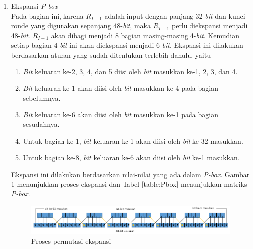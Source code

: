 \begin{enumerate}
	\item Ekspansi \textit{P-box}\\
	Pada bagian ini, karena \begin{math}R_{I-1}\end{math} adalah input dengan panjang 32-\textit{bit} dan kunci ronde yang digunakan sepanjang 48-\textit{bit}, maka \begin{math}R_{I-1}\end{math} perlu diekspansi menjadi 48-\textit{bit}. \begin{math}R_{I-1}\end{math} akan dibagi menjadi 8 bagian masing-masing 4-\textit{bit}. Kemudian setiap bagian 4-\textit{bit} ini akan diekspansi menjadi 6-\textit{bit}. Ekspansi ini dilakukan berdasarkan aturan yang sudah ditentukan terlebih dahulu, yaitu
	\begin{enumerate}
		\item \textit{Bit} keluaran ke-2, 3, 4, dan 5 diisi oleh \textit{bit} masukkan ke-1, 2, 3, dan 4.
		\item \textit{Bit} keluaran ke-1 akan diisi oleh \textit{bit} masukkan ke-4 pada bagian sebelumnya.
		\item \textit{Bit} keluaran ke-6 akan diisi oleh \textit{bit} masukkan ke-1 pada bagian sesudahnya.
		\item Untuk bagian ke-1, \textit{bit} keluaran ke-1 akan diisi oleh \textit{bit} ke-32 masukkan.
		\item Untuk bagian ke-8, \textit{bit} keluaran ke-6 akan diisi oleh \textit{bit} ke-1 masukkan.
	\end{enumerate}
	Ekspansi ini dilakukan berdasarkan nilai-nilai yang ada dalam \textit{P-box}. Gambar \ref{fig:expansi} menunjukkan proses ekspansi dan Tabel \ref{table:Pbox} menunjukkan matriks \textit{P-box}.
	
	\begin{figure}[h]
	\includegraphics[scale=0.5]{Gambar/expansion_permutation}
	\centering
	\caption{Proses permutasi ekspansi}\label{fig:expansi}
	\end{figure}


\end{enumerate}
